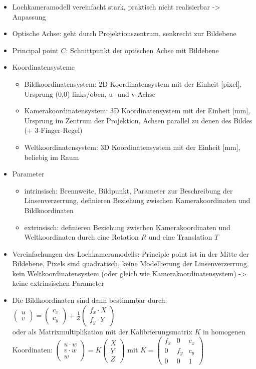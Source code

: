 \documentclass[paper=a4, fontsize=11pt]{scrartcl} %
\numberwithin{equation}{section} %
\numberwithin{figure}{section} %
\numberwithin{table}{section} %
\begin{document}
\begin{itemize}
\item Lochkameramodell vereinfacht stark, praktisch nicht realisierbar -> Anpassung
\item Optische Achse: geht durch Projektionszentrum, senkrecht zur Bildebene
\item Principal point $C$: Schnittpunkt der optischen Achse mit Bildebene
\item Koordinatensysteme
\begin{itemize}
\item Bildkoordinatensystem: 2D Koordinatensystem mit der Einheit [pixel], Ursprung (0,0) links/oben, u- und v-Achse
\item Kamerakoordinatensystem: 3D Koordinatensystem mit der Einheit [mm], Ursprung im Zentrum der Projektion, Achsen parallel zu denen des Bildes (+ 3-Finger-Regel)
\item Weltkoordinatensystem: 3D Koordinatensystem mit der Einheit [mm], beliebig im Raum
\end{itemize}
\item Parameter
\begin{itemize}
\item intrinsisch: Brennweite, Bildpunkt, Parameter zur Beschreibung der Linsenverzerrung, definieren Beziehung zwischen Kamerakoordinaten und Bildkoordinaten
\item extrinsisch: definieren Beziehung zwischen Kamerakoordinaten und Weltkoordinaten durch eine Rotation $R$ und eine Translation $T$
\end{itemize}
\item Vereinfachungen des Lochkameramodells: Principle point ist in der Mitte der Bildebene, Pixels sind quadratisch, keine Modellierung der Linsenverzerrung, kein Weltkoordinatensystem (oder gleich wie Kamerakoordinatensystem) -> keine extrinsischen Parameter
\item Die Bildkoordinaten sind dann bestimmbar durch: $\begin{pmatrix} u \\ v\end{pmatrix} = \begin{pmatrix} c_x \\ c_y\end{pmatrix} + \frac{1}{Z} \begin{pmatrix} f_x \cdot X \\ f_y \cdot Y\end{pmatrix}$\\ oder als Matrixmultiplikation mit der Kalibrierungsmatrix $K$ in homogenen Koordinaten: $\begin{pmatrix} u \cdot w \\ v \cdot w \\ w\end{pmatrix} = K \begin{pmatrix} X \\ Y \\ Z\end{pmatrix}$ mit $K = \begin{pmatrix} f_x & 0 & c_x \\ 0 & f_y & c_y \\ 0 & 0 & 1\end{pmatrix}$

\end{itemize}
\end{document}
